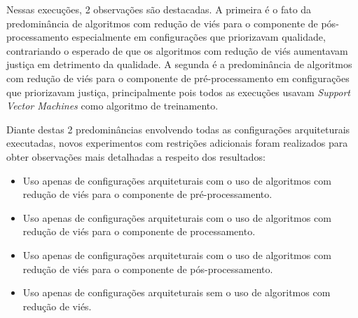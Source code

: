 \documentclass[portugues]{ic-tese}
\begin{document}
\begin{table}[H]
\begin{center}
  \caption{Melhores configurações escolhidas pelo Gerenciador Autonômico \\ Uso dos algoritmos implementados - 25\% Avaliação/75\% \textit{Fairness}}
\label{tbl:ScoreMAPEKGeral2575}
\end{center}
\end{table}

Nessas execuções, 2 observações são destacadas. A primeira é o fato da predominância de algoritmos com redução de viés para o componente de pós-processamento especialmente em configurações que priorizavam qualidade, contrariando o esperado de que os algoritmos com redução de viés aumentavam justiça em detrimento da qualidade. A segunda é a predominância de algoritmos com redução de viés para o componente de pré-processamento em configurações que priorizavam justiça, principalmente pois todos as execuções usavam \textit{Support Vector Machines} como algoritmo de treinamento.

Diante destas 2 predominâncias envolvendo todas as configurações arquiteturais executadas, novos experimentos com restrições adicionais foram realizados para obter observações mais detalhadas a respeito dos resultados:

\begin{itemize}
\item Uso apenas de configurações arquiteturais com o uso de algoritmos com redução de viés para o componente de \mbox{pré-processamento}.
\item Uso apenas de configurações arquiteturais com o uso de algoritmos com redução de viés para o componente de \mbox{processamento}.
\item Uso apenas de configurações arquiteturais com o uso de algoritmos com redução de viés para o componente de \mbox{pós-processamento}.
\item Uso apenas de configurações arquiteturais sem o uso de algoritmos com redução de viés.
\end{itemize}
\end{document}
